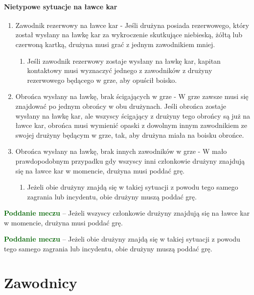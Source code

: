\documentclass[12pt]{article}
\newcommand\other[1]{\bgroup\textcolor{darkgreen}{\textbf{#1}}}
\begin{document}
\paragraph{Nietypowe sytuacje na ławce kar}

\begin{enumerate}
	\item
	      Zawodnik rezerwowy na ławce kar - Jeśli drużyna posiada rezerwowego,
	      który został wysłany na ławkę kar za wykroczenie skutkujące niebieską,
	      żółtą lub czerwoną kartką, drużyna musi grać z jednym zawodnikiem
	      mniej.

	      \begin{enumerate}
		      \item
		            Jeśli zawodnik rezerwowy zostaje wysłany na ławkę kar, kapitan
		            kontaktowy musi wyznaczyć jednego z zawodników z drużyny rezerwowego
		            będącego w grze, aby opuścił boisko.
	      \end{enumerate}
	\item
	      Obrońca wysłany na ławkę, brak ścigających w grze - W grze zawsze musi
	      się znajdować po jednym obrońcy w obu drużynach. Jeśli obrońca zostaje
	      wysłany na ławkę kar, ale wszyscy ścigający z drużyny tego obrońcy są
	      już na ławce kar, obrońca musi wymienić opaski z dowolnym innym
	      zawodnikiem ze swojej drużyny będącym w grze, tak, aby drużyna miała
	      na boisku obrońce.
	\item
	      Obrońca wysłany na ławkę, brak innych zawodników w grze - W mało
	      prawdopodobnym przypadku gdy wszyscy inni członkowie drużyny znajdują
	      się na ławce kar w momencie, drużyna musi poddać grę.

	      \begin{enumerate}
		      \item
		            Jeżeli obie drużyny znajdą się w takiej sytuacji z powodu tego
		            samego zagrania lub incydentu, obie drużyny muszą poddać grę.
	      \end{enumerate}
\end{enumerate}

\other{Poddanie meczu} -- Jeżeli wszyscy członkowie drużyny znajdują się
na ławce kar w momencie, drużyna musi poddać grę.

\other{Poddanie meczu} -- Jeżeli obie drużyny znajdą się w takiej sytuacji
z powodu tego samego zagrania lub incydentu, obie drużyny muszą poddać
grę.


\pagebreak
\section{Zawodnicy}
\end{document}
